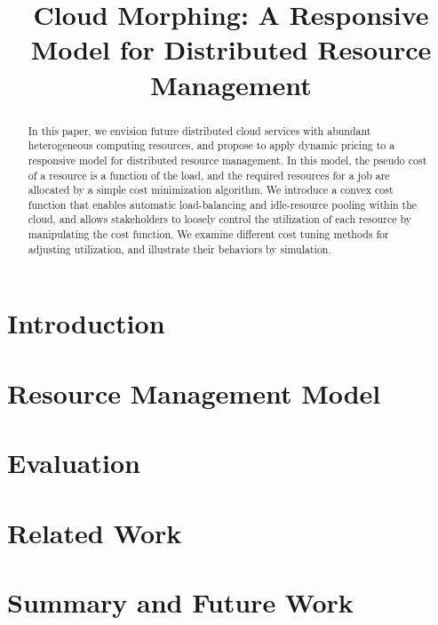 \documentclass[10pt,sigconf,letterpaper,anonymous,nonacm]{acmart}
\title{Cloud Morphing: A Responsive Model for Distributed Resource Management}
\begin{document}
\begin{abstract}

In this paper, we envision future distributed cloud services with
abundant heterogeneous computing resources,
and propose to apply dynamic pricing to a responsive model for
distributed resource management.
In this model, the pseudo cost of a resource is a function of the
load, and the required resources for a job are allocated by a simple
cost minimization algorithm.
We introduce a convex cost function that enables automatic
load-balancing and idle-resource pooling within the cloud, and allows
stakeholders to loosely control the utilization of each resource by
manipulating the cost function. We examine different cost tuning
methods for adjusting utilization, and illustrate their behaviors by
simulation.

\end{abstract}

\maketitle

\section{Introduction}



\section{Resource Management Model}



\section{Evaluation}



\section{Related Work}



\section{Summary and Future Work}





\end{document}
